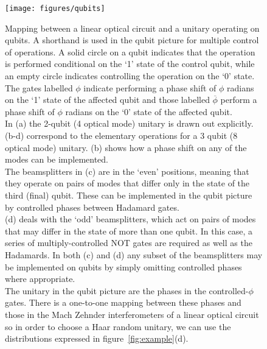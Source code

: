 \documentclass[aps,prl,twocolumn,floatfix]{revtex4}
\begin{document}
\begin{figure}[p]
  \texttt{[image: figures/qubits]}
  \caption{Mapping between a linear optical circuit and a unitary operating on
    qubits. A shorthand is used in the qubit picture for multiple control of
    operations. A solid circle on a qubit indicates that the operation is
    performed conditional on the `1' state of the control qubit, while an empty
    circle indicates controlling the operation on the `0' state. The gates
    labelled \(\phi\) indicate performing a phase shift of \(\phi\) radians on
    the `1' state of the affected qubit and those labelled \(\overline{\phi}\)
    perform a phase shift of \(\phi\) radians on the `0' state of the affected
    qubit. \\
    In (a) the 2-qubit (4 optical mode) unitary is drawn out explicitly.
    (b-d) correspond to the elementary operations for a 3 qubit (8 optical mode)
    unitary. (b) shows how a phase shift on any of the modes can be
    implemented. \\
    The beamsplitters in (c) are in the `even' positions, meaning that they
    operate on pairs of modes that differ only in the state of the third (final)
    qubit. These can be implemented in the qubit picture by controlled phases
    between Hadamard gates. \\
    (d) deals with the `odd' beamsplitters, which act on
    pairs of modes that may differ in the state of more than one qubit. In this
    case, a series of multiply-controlled NOT gates are required as well as the
    Hadamards. In both (c) and (d) any subset of the beamsplitters may be
    implemented on qubits by simply omitting controlled phases where
    appropriate. \\
    The unitary in the qubit picture are the phases in the controlled-\(\phi\)
    gates. There is a one-to-one mapping between these phases and those in the
    Mach Zehnder interferometers of a linear optical circuit so in order to
    choose a Haar random unitary, we can use the distributions expressed in
    figure~\ref{fig:example}(d).}
  \label{fig:qubits}
\end{figure}
  
\clearpage

\end{document}
